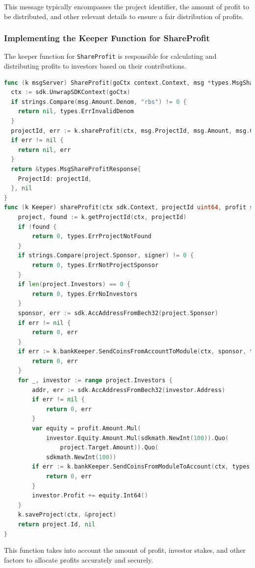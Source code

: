 This message typically encompasses the project identifier, the amount of profit to be distributed, and other relevant details to ensure a fair distribution of profits.

\subsubsection{Implementing the Keeper Function for ShareProfit}

The keeper function for \texttt{ShareProfit} is responsible for calculating and distributing profits to investors based on their contributions.

\begin{lstlisting}[language=go, caption=Keeper implementation for ShareProfit, label={lst:keeper_share_profit}]
func (k msgServer) ShareProfit(goCtx context.Context, msg *types.MsgShareProfit) (*types.MsgShareProfitResponse, error) {
  ctx := sdk.UnwrapSDKContext(goCtx)
  if strings.Compare(msg.Amount.Denom, "rbs") != 0 {
    return nil, types.ErrInvalidDenom
  }
  projectId, err := k.shareProfit(ctx, msg.ProjectId, msg.Amount, msg.Creator)
  if err != nil {
    return nil, err
  }
  return &types.MsgShareProfitResponse{
    ProjectId: projectId,
  }, nil
}
func (k Keeper) shareProfit(ctx sdk.Context, projectId uint64, profit sdk.Coin, signer string) (uint64, error) {
	project, found := k.getProjectId(ctx, projectId)
	if !found {
		return 0, types.ErrProjectNotFound
	}
	if strings.Compare(project.Sponsor, signer) != 0 {
		return 0, types.ErrNotProjectSponsor
	}
	if len(project.Investors) == 0 {
		return 0, types.ErrNoInvestors
	}
	sponsor, err := sdk.AccAddressFromBech32(project.Sponsor)
	if err != nil {
		return 0, err
	}
	if err := k.bankKeeper.SendCoinsFromAccountToModule(ctx, sponsor, types.ModuleName, sdk.NewCoins(profit)); err != nil {
		return 0, err
	}
	for _, investor := range project.Investors {
		addr, err := sdk.AccAddressFromBech32(investor.Address)
		if err != nil {
			return 0, err
		}
		var equity = profit.Amount.Mul(
			investor.Equity.Amount.Mul(sdkmath.NewInt(100)).Quo(
				project.Target.Amount)).Quo(
			sdkmath.NewInt(100))
		if err := k.bankKeeper.SendCoinsFromModuleToAccount(ctx, types.ModuleName, addr, sdk.NewCoins(sdk.NewCoin("rbs", equity))); err != nil {
			return 0, err
		}
		investor.Profit += equity.Int64()
	}
	k.saveProject(ctx, &project)
	return project.Id, nil
}
\end{lstlisting}

This function takes into account the amount of profit, investor stakes, and other factors to allocate profits accurately and securely.

